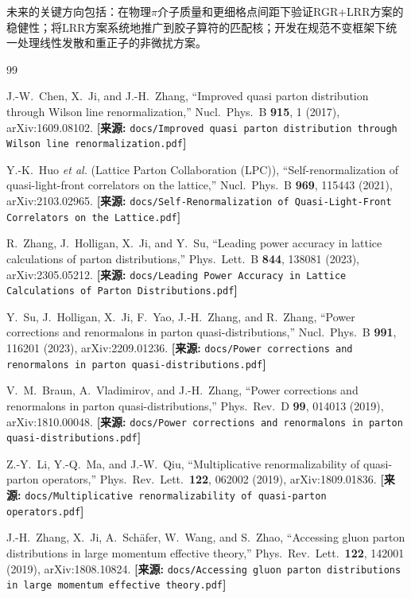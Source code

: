 \documentclass[12pt,a4paper]{ctexart}
\theoremstyle{definition}
\begin{document}
未来的关键方向包括：在物理$\pi$介子质量和更细格点间距下验证RGR+LRR方案的稳健性；将LRR方案系统地推广到胶子算符的匹配核；开发在规范不变框架下统一处理线性发散和重正子的非微扰方案。

\begin{thebibliography}{99}

J.-W.~Chen, X.~Ji, and J.-H.~Zhang,
``Improved quasi parton distribution through Wilson line renormalization,''
Nucl.\ Phys.\ B \textbf{915}, 1 (2017), arXiv:1609.08102.
\quad\textbf{[来源:} \texttt{docs/Improved quasi parton distribution through Wilson line renormalization.pdf}\textbf{]}

Y.-K.~Huo \textit{et al.} (Lattice Parton Collaboration (LPC)),
``Self-renormalization of quasi-light-front correlators on the lattice,''
Nucl.\ Phys.\ B \textbf{969}, 115443 (2021), arXiv:2103.02965.
\quad\textbf{[来源:} \texttt{docs/Self-Renormalization of Quasi-Light-Front Correlators on the Lattice.pdf}\textbf{]}

R.~Zhang, J.~Holligan, X.~Ji, and Y.~Su,
``Leading power accuracy in lattice calculations of parton distributions,''
Phys.\ Lett.\ B \textbf{844}, 138081 (2023), arXiv:2305.05212.
\quad\textbf{[来源:} \texttt{docs/Leading Power Accuracy in Lattice Calculations of Parton Distributions.pdf}\textbf{]}

Y.~Su, J.~Holligan, X.~Ji, F.~Yao, J.-H.~Zhang, and R.~Zhang,
``Power corrections and renormalons in parton quasi-distributions,''
Nucl.\ Phys.\ B \textbf{991}, 116201 (2023), arXiv:2209.01236.
\quad\textbf{[来源:} \texttt{docs/Power corrections and renormalons in parton quasi-distributions.pdf}\textbf{]}

V.~M.~Braun, A.~Vladimirov, and J.-H.~Zhang,
``Power corrections and renormalons in parton quasi-distributions,''
Phys.\ Rev.\ D \textbf{99}, 014013 (2019), arXiv:1810.00048.
\quad\textbf{[来源:} \texttt{docs/Power corrections and renormalons in parton quasi-distributions.pdf}\textbf{]}

Z.-Y.~Li, Y.-Q.~Ma, and J.-W.~Qiu,
``Multiplicative renormalizability of quasi-parton operators,''
Phys.\ Rev.\ Lett.\ \textbf{122}, 062002 (2019), arXiv:1809.01836.
\quad\textbf{[来源:} \texttt{docs/Multiplicative renormalizability of quasi-parton operators.pdf}\textbf{]}

J.-H.~Zhang, X.~Ji, A.~Sch\"afer, W.~Wang, and S.~Zhao,
``Accessing gluon parton distributions in large momentum effective theory,''
Phys.\ Rev.\ Lett.\ \textbf{122}, 142001 (2019), arXiv:1808.10824.
\quad\textbf{[来源:} \texttt{docs/Accessing gluon parton distributions in large momentum effective theory.pdf}\textbf{]}


\end{thebibliography}
\end{document}
